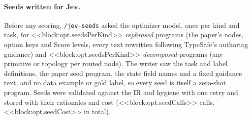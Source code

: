 \paragraph{Seeds written for Jev.}
Before any scoring, \texttt{/jev-seeds} asked the optimizer model, once per kind and task, for <<block:opt.seedsPerKind>> \emph{rephrased} programs (the paper's nodes, option keys and Score levels, every text rewritten following TypeSafe's authoring guidance) and <<block:opt.seedsPerKind>> \emph{decomposed} programs (any primitive or topology per routed node). The writer saw the task and label definitions, the paper seed program, the state field names and a fixed guidance text, and no data example or gold label, so every seed is itself a zero-shot program. Seeds were validated against the IR and hygiene with one retry and stored with their rationales and cost (<<block:opt.seedCalls>> calls, <<block:opt.seedCost>> in total).

